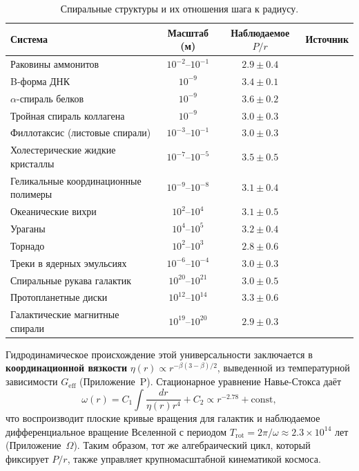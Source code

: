 \documentclass[12pt]{article}
\begin{document}
	\begin{table}[H]
		\centering
		\caption{Спиральные структуры и их отношения шага к радиусу.}
		\label{tab:spiral-examples}
		\small
		\begin{tabular}{@{}l c c c@{}}
			\toprule
			\textbf{Система} & \textbf{Масштаб (м)} & \textbf{Наблюдаемое \(P/r\)} & \textbf{Источник} \\
			\midrule
			Раковины аммонитов & \(10^{-2}\)--\(10^{-1}\) & \(2.9 \pm 0.4\) & \cite{ammonites} \\
			B-форма ДНК & \(10^{-9}\) & \(3.4 \pm 0.1\) & \cite{watsoncrick} \\
			\(\alpha\)-спираль белков & \(10^{-9}\) & \(3.6 \pm 0.2\) & \cite{pauling} \\
			Тройная спираль коллагена & \(10^{-9}\) & \(3.0 \pm 0.3\) & \cite{collagen} \\
			Филлотаксис (листовые спирали) & \(10^{-3}\)--\(10^{-1}\) & \(3.0 \pm 0.3\) & \cite{phyllotaxis} \\
			Холестерические жидкие кристаллы & \(10^{-7}\)--\(10^{-5}\) & \(3.5 \pm 0.5\) & \cite{cholesteric} \\
			Геликальные координационные полимеры & \(10^{-9}\)--\(10^{-8}\) & \(3.1 \pm 0.4\) & \cite{helical-mof} \\
			Океанические вихри & \(10^{2}\)--\(10^{4}\) & \(3.1 \pm 0.5\) & \cite{ocean-eddies} \\
			Ураганы & \(10^{4}\)--\(10^{5}\) & \(3.2 \pm 0.4\) & \cite{hurricanes} \\
			Торнадо & \(10^{2}\)--\(10^{3}\) & \(2.8 \pm 0.6\) & \cite{tornadoes} \\
			Треки в ядерных эмульсиях & \(10^{-6}\)--\(10^{-4}\) & \(3.0 \pm 0.3\) & \cite{nuclear-tracks} \\
			Спиральные рукава галактик & \(10^{20}\)--\(10^{21}\) & \(3.0 \pm 0.5\) & \cite{binney-tremaine} \\
			Протопланетные диски & \(10^{12}\)--\(10^{14}\) & \(3.3 \pm 0.6\) & \cite{ppdisk} \\
			Галактические магнитные спирали & \(10^{19}\)--\(10^{20}\) & \(2.9 \pm 0.3\) & \cite{beck} \\
			\bottomrule
		\end{tabular}
	\end{table}
	
	Гидродинамическое происхождение этой универсальности заключается в \textbf{координационной вязкости} \(\eta(r) \propto r^{-\beta(3-\beta)/2}\), выведенной из температурной зависимости \(G_{\mathrm{eff}}\) (Приложение~P). Стационарное уравнение Навье-Стокса даёт
	\[
	\omega(r) = C_1 \int \frac{dr}{\eta(r) r^4} + C_2 \propto r^{-2.78} + \text{const},
	\]
	что воспроизводит плоские кривые вращения для галактик и наблюдаемое дифференциальное вращение Вселенной с периодом \(T_{\mathrm{rot}} = 2\pi/\omega \approx 2.3\times10^{14}\) лет (Приложение~\(\Omega\)). Таким образом, тот же алгебраический цикл, который фиксирует \(P/r\), также управляет крупномасштабной кинематикой космоса.
	
\end{document}
